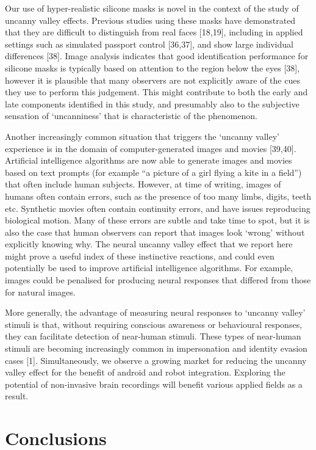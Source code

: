 \documentclass[
]{article}
\begin{document}
Our use of hyper-realistic silicone masks is novel in the context of the study of uncanny valley effects. Previous studies using these masks have demonstrated that they are difficult to distinguish from real faces {[}18,19{]}, including in applied settings such as simulated passport control {[}36,37{]}, and show large individual differences {[}38{]}. Image analysis indicates that good identification performance for silicone masks is typically based on attention to the region below the eyes {[}38{]}, however it is plausible that many observers are not explicitly aware of the cues they use to perform this judgement. This might contribute to both the early and late components identified in this study, and presumably also to the subjective sensation of `uncanniness' that is characteristic of the phenomenon.

Another increasingly common situation that triggers the `uncanny valley' experience is in the domain of computer-generated images and movies {[}39,40{]}. Artificial intelligence algorithms are now able to generate images and movies based on text prompts (for example ``a picture of a girl flying a kite in a field'') that often include human subjects. However, at time of writing, images of humans often contain errors, such as the presence of too many limbs, digits, teeth etc. Synthetic movies often contain continuity errors, and have issues reproducing biological motion. Many of these errors are subtle and take time to spot, but it is also the case that human observers can report that images look `wrong' without explicitly knowing why. The neural uncanny valley effect that we report here might prove a useful index of these instinctive reactions, and could even potentially be used to improve artificial intelligence algorithms. For example, images could be penalised for producing neural responses that differed from those for natural images.

More generally, the advantage of measuring neural responses to `uncanny valley' stimuli is that, without requiring conscious awareness or behavioural responses, they can facilitate detection of near-human stimuli. These types of near-human stimuli are becoming increasingly common in impersonation and identity evasion cases {[}1{]}. Simultaneously, we observe a growing market for reducing the uncanny valley effect for the benefit of android and robot integration. Exploring the potential of non-invasive brain recordings will benefit various applied fields as a result.

\section{Conclusions}\label{conclusions}
\end{document}
